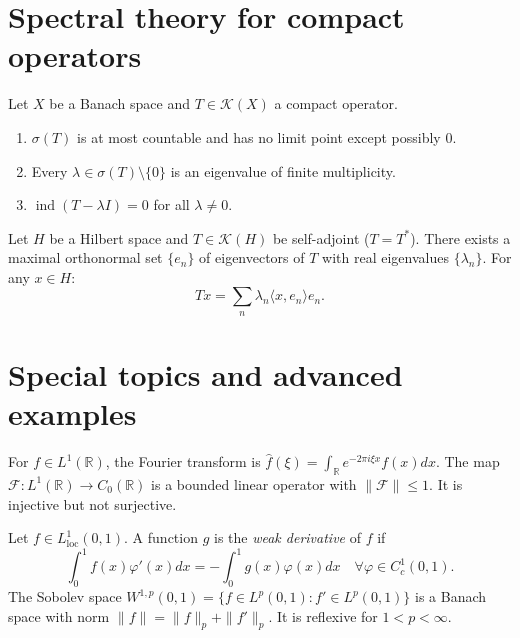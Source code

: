 \section
{Spectral theory for compact operators}
\label{section-spectral-compact}

\begin{theorem}
\label{theorem-spectral-compact-ops}
Let $X$ be a Banach space and $T \in
\mathcal{K}(X)$ a compact operator.
\begin{enumerate}
\item $\sigma(T)$ is at most countable and
has no limit point except possibly $0$.
\item Every $\lambda \in \sigma(T) \setminus
\{0\}$ is an eigenvalue of finite
multiplicity.
\item $\operatorname{ind}(T - \lambda I) = 0$
for all $\lambda \neq 0$.
\end{enumerate}
\end{theorem}

\begin{theorem}
\label{theorem-spectral-compact-selfadjoint}
Let $H$ be a Hilbert space and $T \in
\mathcal{K}(H)$ be self-adjoint ($T = T^*$).
There exists a maximal orthonormal set $\{
e_n \}$ of eigenvectors of $T$ with real
eigenvalues $\{ \lambda_n \}$. For any $x \in
H$:
$$
Tx = \sum_n \lambda_n \langle x, e_n \rangle
e_n.
$$
\end{theorem}

\section
{Special topics and advanced examples}
\label{section-advanced-topics}

\begin{example}
\label{example-fourier-l1}
For $f \in L^1(\mathbb{R})$, the Fourier
transform is $\widehat{f}(\xi) =
\int_\mathbb{R} e^{-2\pi i \xi x} f(x) dx$.
The map $\mathcal{F} : L^1(\mathbb{R}) \to
C_0(\mathbb{R})$ is a bounded linear operator
with $\|\mathcal{F}\| \leq 1$. It is
injective but not surjective.
\end{example}

\begin{example}
\label{example-sobolev-w1p}
Let $f \in L^1_{\operatorname{loc}}(0,1)$. A
function $g$ is the {\it weak derivative} of
$f$ if
$$
\int_0^1 f(x)\varphi'(x) dx = -\int_0^1
g(x)\varphi(x) dx \quad \forall \varphi \in
C_c^1(0,1).
$$
The Sobolev space $W^{1,p}(0,1) = \{ f \in
L^p(0,1) : f' \in L^p(0,1) \}$ is a Banach
space with norm $\|f\| = \|f\|_p + \|f'\|_p$.
It is reflexive for $1 < p < \infty$.
\end{example}

